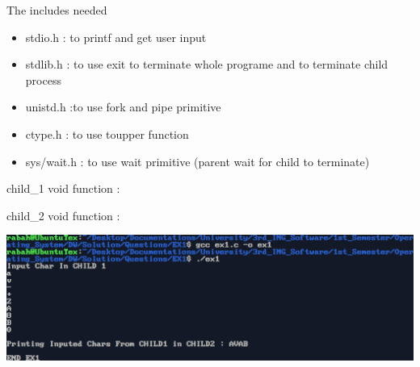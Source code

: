 
\vspace{0.75cm}

The includes needed
\begin{itemize}
    \item stdio.h : to printf and get user input
    \item stdlib.h : to use exit to terminate whole 
programe and to terminate child process
    \item unistd.h :to use fork and pipe primitive
    \item ctype.h : to use toupper function
    \item sys/wait.h : to use wait primitive (parent wait for child to terminate)
\end{itemize}
\newpage


child\_1 void function :


\vspace{0.5cm}

child\_2 void function :




\begin{center}
\includegraphics[width=\textwidth]{Questions/EX1/output.png}
\end{center}

